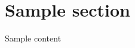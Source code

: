 \documentclass[letterpaper,10pt]{article}
\numberwithin{equation}{section}
\begin{document}
\section{Sample section}
Sample content
\end{document}

